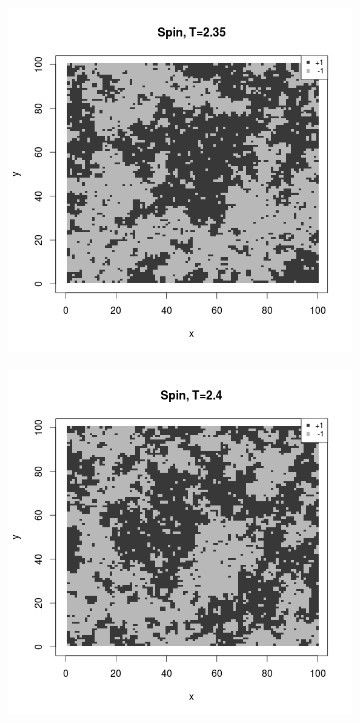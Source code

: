 \documentclass{scrartcl}
\begin{document}
\begin{figure}[ht]
\centering
\begin{subfigure}{.35\textwidth}
  \centering
  \includegraphics[width=1\linewidth]{spins/spinT2_35}
\end{subfigure}%
\begin{subfigure}{.35\textwidth}
  \centering
  \includegraphics[width=1\linewidth]{spins/spinT2_4}

\end{subfigure}
\end{figure}
\end{document}
